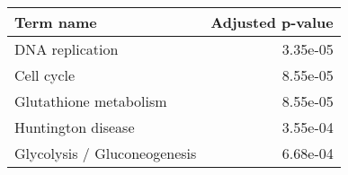 \begin{tabular}{lr}
\toprule
                    Term name &  Adjusted p-value \\
\midrule
              DNA replication &          3.35e-05 \\
                   Cell cycle &          8.55e-05 \\
       Glutathione metabolism &          8.55e-05 \\
           Huntington disease &          3.55e-04 \\
 Glycolysis / Gluconeogenesis &          6.68e-04 \\
\bottomrule
\end{tabular}
